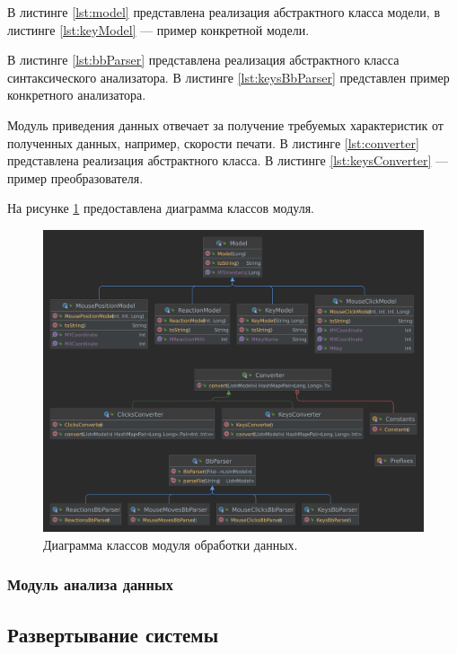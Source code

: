 В листинге \ref{lst:model} представлена реализация абстрактного класса модели, в листинге \ref{lst:keyModel} --- пример конкретной модели.





В листинге \ref{lst:bbParser} представлена реализация абстрактного класса синтаксического анализатора. В листинге \ref{lst:keysBbParser} представлен пример конкретного анализатора.





Модуль приведения данных отвечает за получение требуемых характеристик от полученных данных, например, скорости печати. В листинге \ref{lst:converter} представлена реализация абстрактного класса. В листинге \ref{lst:keysConverter} --- пример преобразователя.





На рисунке \ref{fig:processingUml} предоставлена диаграмма классов модуля.
\begin{figure}[H]
	\centering
	\includegraphics[width=\textwidth]{img/processing.pdf}
	\caption{Диаграмма классов модуля обработки данных.}
	\label{fig:processingUml}
\end{figure}

\subsubsection{Модуль анализа данных}


\subsection{Развертывание системы}

